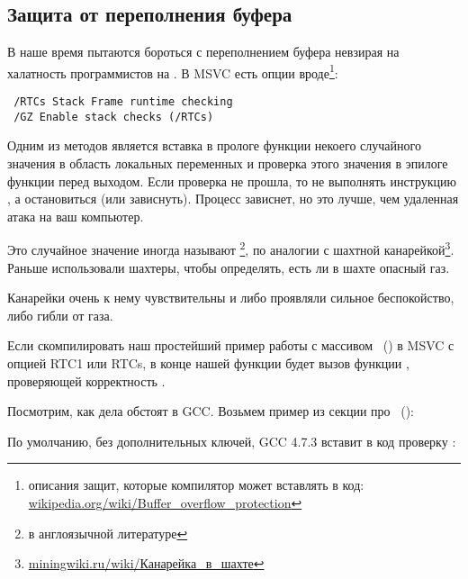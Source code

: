 \subsection{Защита от переполнения буфера}
\label{subsec:BO_protection}

В наше время пытаются бороться с переполнением буфера невзирая на халатность программистов на \CCpp. 
В MSVC есть опции вроде\footnote{описания защит, которые компилятор может вставлять в код:
\href{http://go.yurichev.com/17133}{wikipedia.org/wiki/Buffer\_overflow\_protection}}:

\begin{lstlisting}
 /RTCs Stack Frame runtime checking
 /GZ Enable stack checks (/RTCs)
\end{lstlisting}

Одним из методов является вставка в прологе функции некоего случайного значения в область локальных переменных 
и проверка этого значения в эпилоге функции перед выходом. 
Если проверка не прошла, то не выполнять инструкцию \RET, а остановиться (или зависнуть). 
Процесс зависнет, но это лучше, чем удаленная атака на ваш компьютер.

\newcommand{\CANARYURL}{\href{http://go.yurichev.com/17135}{miningwiki.ru/wiki/Канарейка\_в\_шахте}}

Это случайное значение иногда называют 
\footnote{ в англоязычной литературе}, 
по аналогии с шахтной канарейкой\footnote{\CANARYURL}.
Раньше использовали шахтеры, чтобы определять, есть ли в шахте опасный газ.

Канарейки очень к нему чувствительны и либо проявляли сильное беспокойство, либо гибли от газа.

Если скомпилировать наш простейший пример работы с массивом ~() в \ac{MSVC}
с опцией RTC1 или RTCs, в конце нашей функции будет вызов функции
, проверяющей корректность .

Посмотрим, как дела обстоят в GCC. 
Возьмем пример из секции про ~():



По умолчанию, без дополнительных ключей, GCC 4.7.3 вставит в код проверку :



